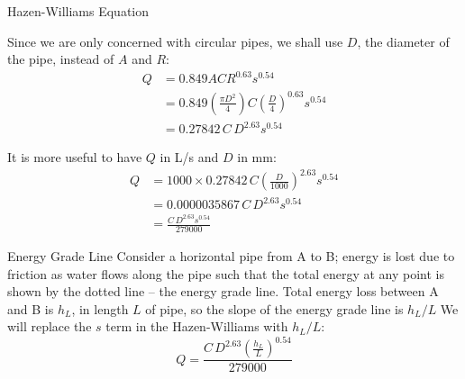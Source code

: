 \documentclass[9pt,xcolor={svgnames, x11names},mathpazo, professionalfonts]{beamer}
\begin{document}

\begin{frame}{Hazen-Williams Equation}
	
	Since we are only concerned with circular pipes, we shall use $D$, the diameter of the pipe, instead of $A$ and $R$:
	\begin{align*}
		Q & = 0.849ACR^{0.63}s^{0.54}                                                     \\
		  & = 0.849\left(\frac{\pi D^2}{4}\right)C\left(\frac{D}{4}\right)^{0.63}s^{0.54} \\
		  & = 0.27842\,C\,D^{2.63}s^{0.54}                                                
	\end{align*}
	\pause
	\parm
	
	It is more useful to have $Q$ in L/s and $D$ in mm:
	\begin{align*}
		Q & = 1000\times 0.27842\,C\left(\frac{D}{1000}\right)^{2.63}s^{0.54} \\
		  & = 0.0000035867\,C\,D^{2.63}s^{0.54}                               \\
		  & = \frac{C\,D^{2.63}s^{0.54}}{279000}                              
	\end{align*}
	
\end{frame}



\begin{frame}{Energy Grade Line}
	Consider a horizontal pipe from A to B; energy is lost due to friction as water flows along the pipe such that the total energy at any point is shown by the dotted line -- the energy grade line.
	\parm
	Total energy loss between A and B is $h_L$, in length $L$ of pipe, so the slope of the energy grade line is $h_L/L$
	\parm
	We will replace the $s$ term in the Hazen-Williams with $h_L/L$:
	\[ Q = \frac{C\,D^{2.63}\left(\frac{h_L}{L}\right)^{0.54}}{279000} \]
	
	
	
	
\end{frame}

\end{document}
